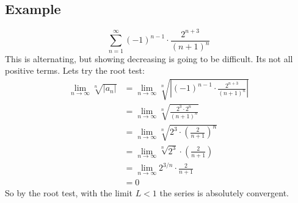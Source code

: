 \documentclass{report}
\begin{document}
    \subsection{Example}
        \[\sum_{n = 1}^{\infty} (-1)^{n-1} \cdot \frac{2^{n+3}}{(n+1)^n}\]
        This is alternating, but showing decreasing is going to be difficult. Its not all positive terms.
        Lets try the root test:
        \begin{align*}
            \lim_{n \to \infty} \sqrt[n]{|a_n|}
            &= \lim_{n \to \infty} \sqrt[n]{\left| (-1)^{n-1} \cdot \frac{2^{n+3}}{(n+1)^n} \right|} \\
            &= \lim_{n \to \infty} \sqrt[n]{\frac{2^3 \cdot 2^n}{(n+1)^n}} \\
            &= \lim_{n \to \infty} \sqrt[n]{2^3 \cdot \left(\frac{2}{n+1}\right)^n } \\
            &= \lim_{n \to \infty} \sqrt[n]{2^3} \cdot \left(\frac{2}{n+1}\right) \\
            &= \lim_{n \to \infty} 2^{3/n} \cdot \frac{2}{n+1} \\
            &= 0
        \end{align*}
        So by the root test, with the limit \(L < 1\) the series is absolutely convergent.

\newpage
\end{document}
